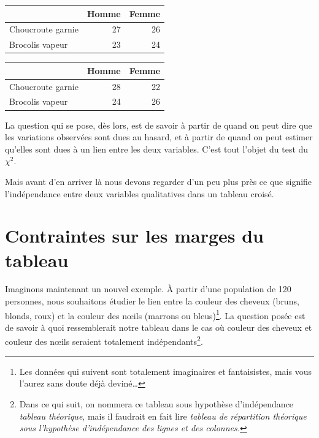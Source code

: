 \documentclass[a4paper,10pt,twoside,francais]{report}
\newcommand{\chid}{$\chi^2$\xspace}
\begin{document}
\begin{center}
  \hfill
  \begin{minipage}[c]{.46\linewidth}
    \begin{tabular}[!h]{lrr}
      \toprule
      & Homme & Femme \\
      \midrule
      Choucroute garnie & 27 & 26 \\
      Brocolis vapeur & 23 & 24 \\
      \bottomrule
    \end{tabular}
  \end{minipage} 
  \hfill
  \begin{minipage}[c]{.46\linewidth}
    \begin{tabular}[!h]{lrr}
      \toprule
      & Homme & Femme \\
      \midrule
      Choucroute garnie & 28 & 22 \\
      Brocolis vapeur &  24 & 26 \\
      \bottomrule
    \end{tabular}
  \end{minipage}
  \hfill
\end{center}

La question qui se pose, dès lors, est de savoir à partir de quand on
peut dire que les variations observées sont dues au hasard, et à
partir de quand on peut estimer qu'elles sont dues à un lien entre les
deux variables. C'est tout l'objet du test du \chid.

Mais avant d'en arriver là nous devons regarder d'un peu plus près ce
que signifie l'indépendance entre deux variables qualitatives dans un
tableau croisé.


\section{Contraintes sur les marges du tableau}
\label{ssec-contrmar}

Imaginons maintenant un nouvel exemple. À partir d'une population de
120 personnes, nous souhaitons étudier le lien entre la couleur des
cheveux (bruns, blonds, roux) et la couleur des n\oe{}ils (marrons ou
bleus)\footnote{Les données qui suivent sont totalement imaginaires et
  fantaisistes, mais vous l'aurez sans doute déjà deviné\ldots}. La
question posée est de savoir à quoi ressemblerait notre tableau dans
le cas où couleur des cheveux et couleur des n\oe{}ils seraient
totalement indépendants\footnote{Dans ce qui suit, on nommera ce
  tableau sous hypothèse d'indépendance \textit{tableau théorique},
  mais il faudrait en fait lire \textit{tableau de répartition
    théorique sous l'hypothèse d'indépendance des lignes et des
    colonnes.}}.
\end{document}
